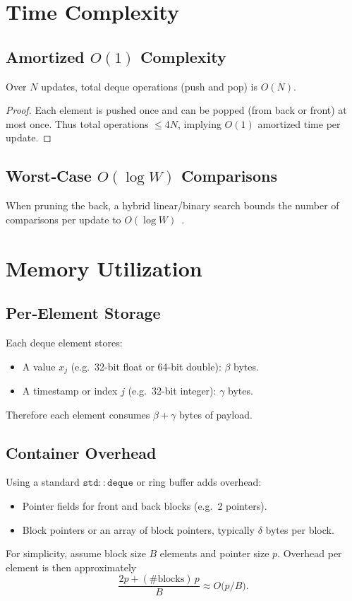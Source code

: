 \documentclass[12pt]{article}
\begin{document}
\section{Time Complexity}
\subsection{Amortized \(O(1)\) Complexity}
\begin{theorem}
Over \(N\) updates, total deque operations (push and pop) is \(O(N)\).
\end{theorem}
\begin{proof}
Each element is pushed once and can be popped (from back or front) at most once.  Thus total operations \(\le 4N\), implying \(O(1)\) amortized time per update.
\end{proof}

\subsection{Worst‐Case \(O(\log W)\) Comparisons}
When pruning the back, a hybrid linear/binary search bounds the number of comparisons per update to \(O(\log W)\)~\cite{Lemire2006}.

\section{Memory Utilization}
\subsection{Per‐Element Storage}
Each deque element stores:
\begin{itemize}
  \item A value \(x_j\) (e.g.\ 32-bit float or 64-bit double): \(\beta\) bytes.
  \item A timestamp or index \(j\) (e.g.\ 32-bit integer): \(\gamma\) bytes.
\end{itemize}
Therefore each element consumes \(\beta+\gamma\) bytes of payload.

\subsection{Container Overhead}
Using a standard \(\mathtt{std::deque}\) or ring buffer adds overhead:
\begin{itemize}
  \item Pointer fields for front and back blocks (e.g.\ 2 pointers).
  \item Block pointers or an array of block pointers, typically \(\delta\) bytes per block.
\end{itemize}
For simplicity, assume block size \(B\) elements and pointer size \(p\).  Overhead per element is then approximately
\[
\frac{2p + (\text{#blocks})\,p}{B}\approx O\!\bigl(p/B\bigr).
\]
\end{document}
